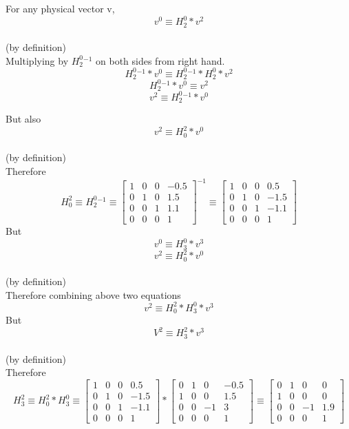 \documentclass[12pt]{article}
\newcommand{\bydefn}{{\\ \color{blue} \hspace*{\fill}(by definition)} \\}
\begin{document}
For any physical vector v,
\[
  v^{0} \equiv H_{2}^{0} * v^{2}
\]
\bydefn
Multiplying by $ H_{2}^{0}^{-1} $ on both sides from right hand.
\[
  H_{2}^{0}^{-1} * v^{0} \equiv H_{2}^{0}^{-1} * H_{2}^{0} * v^{2}
\]
\[
  H_{2}^{0}^{-1} * v^{0} \equiv v^{2}
\]
\[
  v^{2} \equiv H_{2}^{0}^{-1} * v^{0}
\]

But also
\[
  v^{2} \equiv H_{0}^{2} * v^{0}
\]
\bydefn
Therefore
\[
  H_{0}^{2} \equiv H_{2}^{0}^{-1}
  \equiv \begin{bmatrix}
          1 & 0 & 0 & -0.5\\
          0 & 1 & 0 & 1.5\\
          0 & 0 & 1 & 1.1\\
          0 & 0 & 0 & 1
        \end{bmatrix}^{-1}
  \equiv \begin{bmatrix}
          1 & 0 & 0 & 0.5\\
          0 & 1 & 0 & -1.5\\
          0 & 0 & 1 & -1.1\\
          0 & 0 & 0 & 1
        \end{bmatrix}
\]
But
\[
  v^{0} \equiv H_{3}^{0} * v^{3}
\]
\[
  v^{2} \equiv H_{0}^{2} * v^{0}
\]
\bydefn

Therefore combining above two equations
\[
  v^{2} \equiv H_{0}^{2} * H_{3}^{0} * v^{3}
\]
But
\[
  V^{2} \equiv H_{3}^{2} * v^{3}
\]
\bydefn

Therefore
\[
  H_{3}^{2} \equiv H_{0}^{2} * H_{3}^{0}
  \equiv \begin{bmatrix}
          1 & 0 & 0 & 0.5\\
          0 & 1 & 0 & -1.5\\
          0 & 0 & 1 & -1.1\\
          0 & 0 & 0 & 1
        \end{bmatrix}
        * \begin{bmatrix}
          0 & 1 & 0 & -0.5\\
          1 & 0 & 0 & 1.5\\
          0 & 0 & -1 & 3\\
          0 & 0 & 0 & 1
        \end{bmatrix}
  \equiv \begin{bmatrix}
          0 & 1 & 0 & 0\\
          1 & 0 & 0 & 0\\
          0 & 0 & -1 & 1.9\\
          0 & 0 & 0 & 1
        \end{bmatrix}
\]
\end{document}
